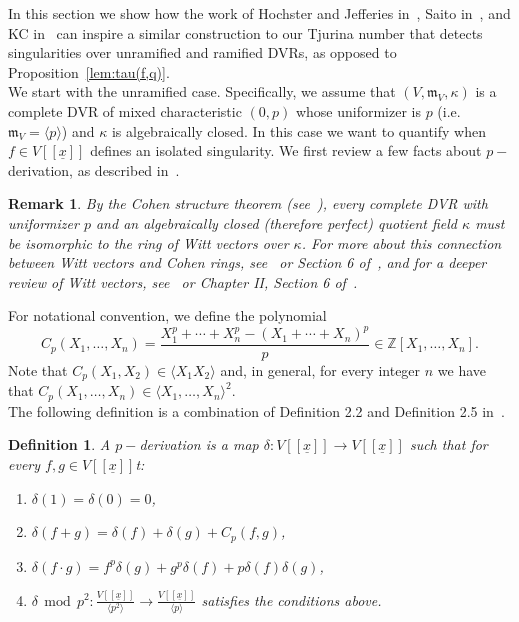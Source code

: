 \documentclass{article}
\newtheorem{definition}[theorem]{Definition}
\newtheorem{remark}[theorem]{Remark}
\newcommand{\maxV}{\mathfrak{m}_V}
\newcommand{\Vx}{V[[\underline{x}]]}
\numberwithin{theorem}{section}
\renewcommand{\mod}{\,\operatorname{mod}\,}
\begin{document}
In this section we show how the work of Hochster and Jefferies in~\cite{hochster2021jacobian}, Saito in~\cite{saito2022frobenius}, and KC in~\cite{kc2024singular} can inspire a similar construction to our Tjurina number that detects singularities over unramified and ramified DVRs, as opposed to Proposition~\ref{lem:tau(f,q)}. \\ 

We start with the unramified case. Specifically, we assume that $(V, \maxV, \kappa)$ is a complete DVR of mixed characteristic $(0,p)$ whose uniformizer is $p$ (i.e. $\maxV = \langle p \rangle$) and $\kappa$ is algebraically closed. In this case we want to quantify when $f \in \Vx$ defines an isolated singularity. We first review a few facts about $p-$derivation, as described in~\cite{hochster2021jacobian}. 

\begin{remark}
    \textup{By the Cohen structure theorem (see~\cite{cohen1946structure}), every complete DVR with uniformizer $p$ and an algebraically closed (therefore perfect) quotient field $\kappa$ must be isomorphic to the ring of Witt vectors over $\kappa$. For more about this connection between Witt vectors and Cohen rings, see~\cite{anscombe2022model} or Section 6 of~\cite{hazewinkel2009witt}, and for a deeper review of Witt vectors, see~\cite{rabinoff2014theory} or Chapter II, Section 6 of~\cite{serre1979local}.}
\end{remark}


For notational convention, we define the polynomial $$C_p\left(X_1, \dots, X_n\right) = \frac{X_1^p + \cdots +X_n^p - \left(X_1+\cdots +X_n\right)^p}{p} \in \mathbb{Z}[X_1, \dots, X_n].$$ Note that $C_p\left(X_1,X_2\right) \in \langle X_1X_2 \rangle
$ and, in general, for every integer $n$ we have that $C_p\left(X_1, \dots, X_n\right) \in \langle X_1, \dots, X_n \rangle^2$. \\

The following definition is a combination of Definition 2.2 and Definition 2.5 in~\cite{hochster2021jacobian}. 


\begin{definition}
    A $p-$derivation is a map $\delta \colon \Vx \to \Vx$ such that for every $f, g \in \Vx$t:
    \begin{enumerate}
        \item $\delta\left(1\right)=\delta\left(0\right)=0$,
        \item $\delta\left(f+g\right)=\delta\left(f\right) + \delta\left(g\right) + C_p\left(f,g\right)$, 
        \item $\delta\left(f\cdot g\right) = f^p \delta\left(g\right) + g^p \delta\left(f\right) + p\delta\left(f\right) \delta\left(g\right)$,
        \item $\delta \mod    p^2 \colon \frac{\Vx}{\langle p^2 \rangle} \to \frac{\Vx}{\langle p \rangle}$ satisfies the conditions above.
    \end{enumerate}
\end{definition}
\end{document}
